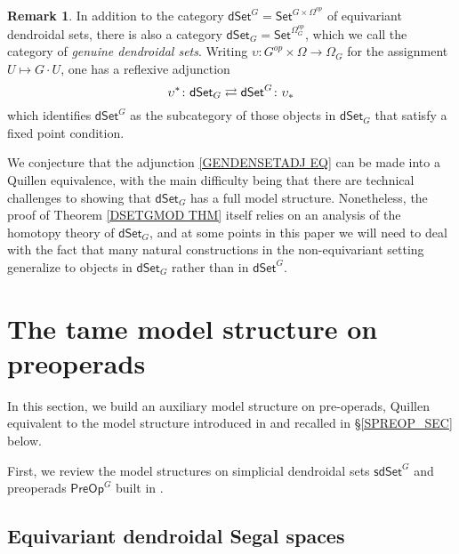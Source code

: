 \documentclass[a4paper,10pt
,draft
]{article}%
\numberwithin{equation}{section}
\numberwithin{figure}{section}
\theoremstyle{definition} %
\newtheorem{remark}[equation]{Remark}%
\newcommand{\dSet}{\mathsf{dSet}}
\newcommand{\1}{\ensuremath{\mathbbm 1}}%
\begin{document}
\begin{remark}\label{GENDENSETADJ REM}
	In addition to the category
	$\mathsf{dSet}^G = \mathsf{Set}^{G \times \Omega^{op}}$
	of equivariant dendroidal sets,
	there is also a category
	$\mathsf{dSet}_G = \mathsf{Set}^{\Omega_G^{op}}$,
	which we call the category of 
	\emph{genuine dendroidal sets}.
	Writing
	$\upsilon \colon G^{op} \times \Omega \to \Omega_G$
	for the assignment
	$U \mapsto G \cdot U$,
	one has a reflexive adjunction 
	\begin{equation}\label{GENDENSETADJ EQ}
	\upsilon^{\**} \colon \dSet_G \rightleftarrows \dSet^G \colon \upsilon_{\**}
	\end{equation}	
	which identifies 
	$\dSet^G$
	as the subcategory of those objects in 
	$\dSet_G$
	that satisfy a fixed point condition.
	
	We conjecture that the adjunction 
	\eqref{GENDENSETADJ EQ}
	can be made into a Quillen equivalence,
	with the main difficulty being that there are technical challenges to showing that $\dSet_G$ has a full model structure.
	Nonetheless, 
	the proof of Theorem \ref{DSETGMOD THM} itself
	relies on an analysis of the homotopy theory of 
	$\dSet_G$, 
	and at some points in this paper we will need to deal with the fact that many natural constructions in the non-equivariant setting generalize to objects in 
	$\dSet_G$ rather than in $\dSet^G$.
\end{remark}




\newpage





\section{The tame model structure on preoperads}
\label{TAME_SEC}


{\color{orange}
  In this section, we build an auxiliary model structure on pre-operads,
  Quillen equivalent to the model structure introduced in \cite{BP_edss} and recalled in \S \ref{SPREOP_SEC} below.
}

First, we review the model structures on
simplicial dendroidal sets $\mathsf{sdSet}^G$
and preoperads $\mathsf{PreOp}^G$ built in \cite{BP_edss}.


\subsection{Equivariant dendroidal Segal spaces}
\label{JT_SEC}
\end{document}
